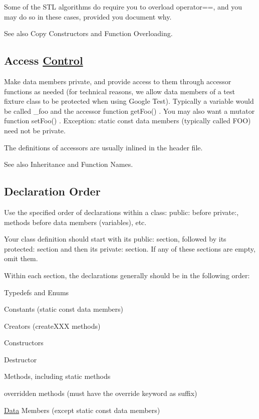 Some of the S\+TL algorithms do require you to overload {\ttfamily operator==}, and you may do so in these cases, provided you document why.

See also Copy Constructors and Function Overloading.

\subsection*{Access \hyperlink{classControl}{Control}}

Make data members private, and provide access to them through accessor functions as needed (for technical reasons, we allow data members of a test fixture class to be protected when using Google Test). Typically a variable would be called {\ttfamily \+\_\+foo} and the accessor function {\ttfamily get\+Foo()} . You may also want a mutator function {\ttfamily set\+Foo()} . Exception\+: static const data members (typically called F\+OO) need not be private.

The definitions of accessors are usually inlined in the header file.

See also Inheritance and Function Names.

\subsection*{Declaration Order}

Use the specified order of declarations within a class\+: public\+: before private\+:, methods before data members (variables), etc.

Your class definition should start with its public\+: section, followed by its protected\+: section and then its private\+: section. If any of these sections are empty, omit them.

Within each section, the declarations generally should be in the following order\+:


\begin{DoxyItemize}
\item Typedefs and Enums
\item Constants ({\ttfamily static const} data members)
\item Creators ({\ttfamily create\+X\+XX} methods)
\item Constructors
\item Destructor
\item Methods, including static methods
\item overridden methods (must have the {\ttfamily override} keyword as suffix)
\item \hyperlink{classData}{Data} Members (except {\ttfamily static const} data members)
\end{DoxyItemize}

